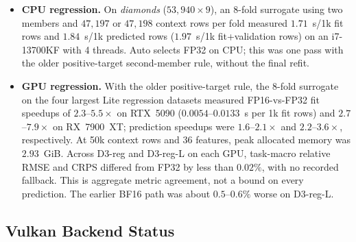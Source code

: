 \documentclass[11pt]{article}
\begin{document}
\begin{itemize}
\item \textbf{CPU regression.} On \emph{diamonds} ($53{,}940\times9$), an 8-fold surrogate using two members and $47{,}197$ or $47{,}198$ context rows per fold measured $1.71$~s/1k fit rows and $1.84$~s/1k predicted rows ($1.97$~s/1k fit+validation rows) on an i7-13700KF with 4 threads. Auto selects FP32 on CPU; this was one pass with the older positive-target second-member rule, without the final refit. %
\item \textbf{GPU regression.} With the older positive-target rule, the 8-fold surrogate on the four largest Lite regression datasets measured FP16-vs-FP32 fit speedups of $2.3$--$5.5\times$ on RTX~5090 ($0.0054$--$0.0133$~s per 1k fit rows) and $2.7$--$7.9\times$ on RX~7900~XT; prediction speedups were $1.6$--$2.1\times$ and $2.2$--$3.6\times$, respectively. At 50k context rows and 36 features, peak allocated memory was $2.93$~GiB. Across D3-reg and D3-reg-L on each GPU, task-macro relative RMSE and CRPS differed from FP32 by less than $0.02\%$, with no recorded fallback. This is aggregate metric agreement, not a bound on every prediction. The earlier BF16 path was about $0.5$--$0.6\%$ worse on D3-reg-L. %
\end{itemize}

\subsection{Vulkan Backend Status}
\label{sec:vulkan-status}
\end{document}
